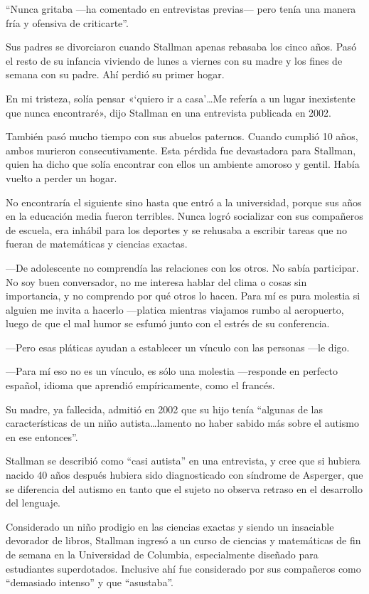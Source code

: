 \documentclass[oneside,twocolumn]{article}
\begin{document}
``Nunca gritaba ---ha comentado en entrevistas previas--- pero tenía una manera fría y ofensiva de 
criticarte''.

Sus padres se divorciaron cuando Stallman apenas rebasaba los cinco años. Pasó el resto de su 
infancia viviendo de lunes a viernes con su madre y los fines de semana con su padre. Ahí perdió 
su primer hogar.

En mi tristeza, solía pensar «`quiero ir a casa’\ldots Me refería a un lugar inexistente que nunca 
encontraré», dijo Stallman en una entrevista publicada en 2002.

También pasó mucho tiempo con sus abuelos paternos. Cuando cumplió 10 años, ambos murieron 
consecutivamente. Esta pérdida fue devastadora para Stallman, quien ha dicho que solía encontrar 
con ellos un ambiente amoroso y gentil. Había vuelto a perder un hogar.

No encontraría el siguiente sino hasta que entró a la universidad, porque sus años en la educación 
media fueron terribles. Nunca logró socializar con sus compañeros de escuela, era inhábil para los 
deportes y se rehusaba a escribir tareas que no fueran de matemáticas y ciencias exactas.

---De adolescente no comprendía las relaciones con los otros. No sabía participar. No soy buen 
conversador, no me interesa hablar del clima o cosas sin importancia, y no comprendo por qué otros 
lo hacen. Para mí es pura molestia si alguien me invita a hacerlo ---platica mientras viajamos rumbo 
al aeropuerto, luego de que el mal humor se esfumó junto con el estrés de su conferencia.

---Pero esas pláticas ayudan a establecer un vínculo con las personas ---le digo.

---Para mí eso no es un vínculo, es sólo una molestia ---responde en perfecto español, idioma 
que aprendió empíricamente, como el francés.

Su madre, ya fallecida, admitió en 2002 que su hijo tenía ``algunas de las características de un 
niño autista\ldots lamento no haber sabido más sobre el autismo en ese entonces''.

Stallman se describió como ``casi autista'' en una entrevista, y cree que si hubiera nacido 40 
años después hubiera sido diagnosticado con síndrome de Asperger, que se diferencia del autismo en 
tanto que el sujeto no observa retraso en el desarrollo del lenguaje.

Considerado un niño prodigio en las ciencias exactas y siendo un insaciable devorador de libros, 
Stallman ingresó a un curso de ciencias y matemáticas de fin de semana en la Universidad de Columbia, 
especialmente diseñado para estudiantes superdotados. Inclusive ahí fue considerado por sus compañeros 
como ``demasiado intenso'' y que ``asustaba''.
\end{document}
